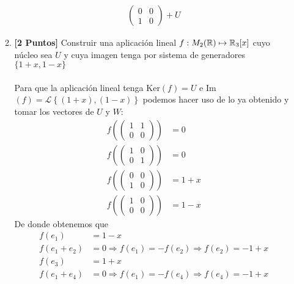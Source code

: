\documentclass[12pt]{article}
\begin{document}
\begin{enumerate}
\begin{enumerate}
\begin{align*}
\begin{pmatrix}
				            0 & 0 \\
				            1 & 0
			            \end{pmatrix} + U
		            \end{align*}
		      \item \textbf{[2 Puntos]} Construir una aplicación lineal $f : M_2({\mathbb{R}}) \mapsto {\mathbb{R}}_3[x] $ cuyo núcleo sea $U$ y cuya
		            imagen tenga por sistema de generadores $\{1+x,1-x\}$\\ \\
		            Para que la aplicación lineal tenga Ker$(f)=U$ e Im$(f)=\mathcal{L}\left\{(1+x),(1-x)\right\}$ podemos hacer uso de lo
		            ya obtenido y tomar los vectores de $U$ y $W$:
		            \begin{align*}
			            f\left(\begin{pmatrix}
				                   1 & 1 \\
				                   0 & 0
			                   \end{pmatrix}\right) & = 0    \\
			            f\left(\begin{pmatrix}
				                   1 & 0 \\
				                   0 & 1
			                   \end{pmatrix}\right) & = 0    \\
			            f\left(\begin{pmatrix}
				                   0 & 0 \\
				                   1 & 0
			                   \end{pmatrix} \right) & = 1+x \\
			            f\left(\begin{pmatrix}
				                   1 & 0 \\
				                   0 & 0
			                   \end{pmatrix} \right) & = 1-x
		            \end{align*}
		            De donde obtenemos que
		            \begin{align*}
			            f(e_1)       & = 1-x                                                        \\
			            f(e_1 + e_2) & = 0 \Rightarrow f(e_1) = -f(e_2) \Rightarrow f(e_2) = -1 + x \\
			            f(e_3)       & = 1+x                                                        \\
			            f(e_1 + e_4) & = 0 \Rightarrow f(e_1) = -f(e_4) \Rightarrow f(e_4) = -1 + x \\

\end{align*}
\end{enumerate}
\end{enumerate}
\end{document}
